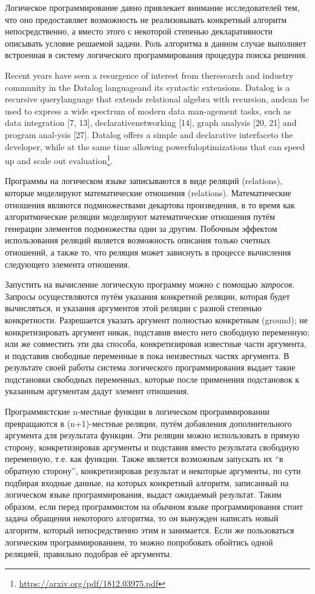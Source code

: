 
{\actuality}
Логическое программирование давно привлекает внимание исследователей тем, что оно предоставляет возможность не реализовывать конкретный алгоритм непосредственно, а вместо этого с некоторой степенью декларативности описывать условие решаемой задачи. Роль алгоритма в данном случае выполняет встроенная в систему логического программирования процедура поиска решения.

Recent years have seen a resurgence of interest from theresearch and industry community in the Datalog languageand  its  syntactic  extensions.   Datalog  is  a  recursive  querylanguage that extends relational algebra with recursion, andcan be used to express a wide spectrum of modern data man-agement tasks, such as data integration [7, 13], declarativenetworking [14], graph analysis [20, 21] and program anal-ysis [27].  Datalog offers a simple and declarative interfaceto the developer, while at the same time allowing powerfuloptimizations that can speed up and scale out evaluation\footnote{\url{https://arxiv.org/pdf/1812.03975.pdf}}.

Программы на логическом языке записываются в виде реляций (relations), которые моделируют математические отношения (relations). 
Математические отношения являются подмножествами декартова произведения, в то время как алгоритмические реляции моделируют математические отношения путём генерации элементов подмножества один за другим. Побочным эффектом использования реляций является возможность описания только счетных отношений, а также то, что реляция может зависнуть в процессе вычисления следующего элемента отношения.

Запустить на вычисление логическую программу можно с помощью \emph{запросов}. Запросы осуществляются путём указания конкретной реляции, которая будет вычисляться, и указания аргументов этой реляции с разной степенью конкретности. Разрешается указать аргумент полностью конкретным (ground); не конкретизировать аргумент никак, подставив вместо него свободную переменную; или же совместить эти два способа, конкретизировав известные части аргумента, и подставив свободные переменные в пока неизвестных частях аргумента. В результате своей работы система логического программирования выдает такие подстановки свободных переменных, которые после применения подстановок к указанным аргументам дадут элемент отношения.

Программистские n-местные функции в логическом программировании 
превращаются в (n+1)-местные реляции, путём добавления дополнительного аргумента для результата функции. Эти реляции можно использовать в прямую сторону, конкретизировав аргументы и подставив вместо результата свободную переменную, т.е. как функции. Также является возможным запускать их ``в обратную сторону'', конкретизировав результат и некоторые аргументы, по сути подбирая входные данные, на которых конкретный алгоритм, записанный на логическом языке программирования, выдаст ожидаемый результат. Таким образом, если перед программистом на обычном языке программирования стоит задача обращения некоторого алгоритма, то он вынужден написать новый алгоритм, который непосредственно этим и занимается. Если же пользоваться логическим программированием, то можно попробовать обойтись одной реляцией, правильно подобрав её аргументы.

